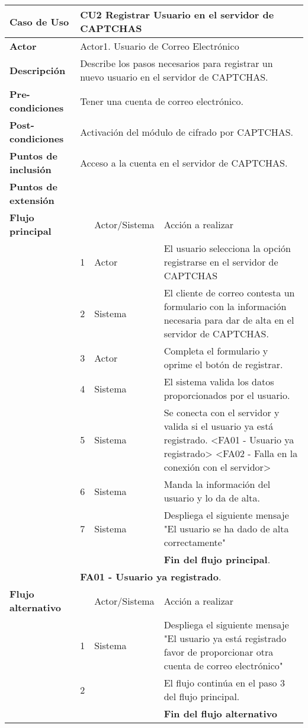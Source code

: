 \documentclass[12pt,oneside,onecolumn,openany]{report}
\begin{document}
 \begin{longtable}[H]{| p{} | p{} |p{4cm}|p{5cm}|}%
     \hline
     \textbf{Caso de Uso} &\multicolumn{3}{|l|}{CU2 Registrar Usuario en el servidor de CAPTCHAS}\\
     \hline
     \textbf{Actor} & \multicolumn{3}{|l|}{Actor1. Usuario de Correo Electrónico}\\
     \hline
     \textbf{Descripción} & \multicolumn{3}{|p{10cm}|}{Describe los pasos necesarios para registrar un nuevo usuario en el servidor de CAPTCHAS.}\\
     \hline
     \textbf{Pre-condiciones} & \multicolumn{3}{|l|}{Tener una cuenta de correo electrónico.}\\
     \hline
     \textbf{Post-condiciones} & \multicolumn{3}{|l|}{Activación del módulo de cifrado por CAPTCHAS.}\\
     \hline
     \textbf{Puntos de inclusión} & \multicolumn{3}{|l|}{Acceso a la cuenta en el servidor de CAPTCHAS.}\\
     \hline
     \textbf{Puntos de extensión} & \multicolumn{3}{|l|}{}\\
     \hline
     \textbf{Flujo principal} & & Actor/Sistema & Acción a realizar\\
     \hline
     & 1 & Actor & El usuario selecciona la opción registrarse en el servidor de CAPTCHAS\\
     \hline
     & 2 & Sistema & El cliente de correo contesta un formulario con la información necesaria para dar de alta en el servidor de CAPTCHAS.\\
     \hline
     & 3 & Actor & Completa el formulario y oprime el botón de registrar.\\
     \hline
     & 4 & Sistema & El sistema valida los datos proporcionados por el usuario.\\
     \hline
     & 5 & Sistema & Se conecta con el servidor y valida si el usuario ya está registrado. <FA01 - Usuario ya registrado> <FA02 - Falla en la conexión con el servidor>\\
     \hline
     & 6 & Sistema & Manda la información del usuario y lo da de alta.\\
     \hline
     & 7 & Sistema & Despliega el siguiente mensaje "El usuario se ha dado de alta correctamente"\\
     \hline
     & & & \textbf{Fin del flujo principal}.\\
     \hline
     & \multicolumn{3}{|l|}{\textbf{FA01 - Usuario ya registrado}.}\\
     \hline
     \textbf{Flujo alternativo} & & Actor/Sistema & Acción a realizar\\
     \hline
     & 1 & Sistema & Despliega el siguiente mensaje "El usuario ya está registrado favor de proporcionar otra cuenta de correo electrónico"\\
     \hline
     & 2 & & El flujo continúa en el paso 3 del flujo principal.\\
     \hline
     &  & & \textbf{Fin del flujo alternativo}\\
     \hline
     

\end{longtable}
\end{document}
